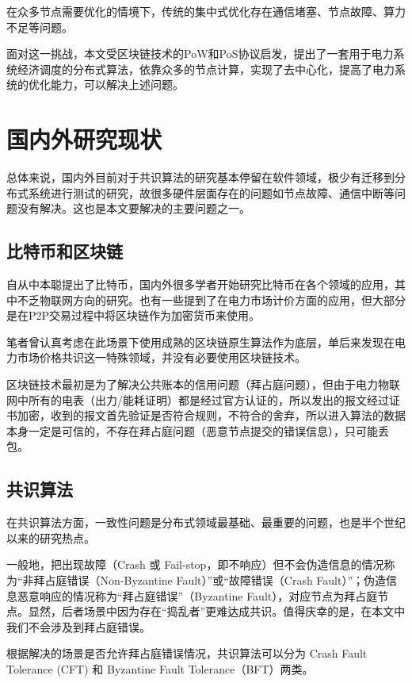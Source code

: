 在众多节点需要优化的情境下，传统的集中式优化存在通信堵塞、节点故障、算力不足等问题。

面对这一挑战，本文受区块链技术的PoW和PoS协议启发，提出了一套用于电力系统经济调度的分布式算法，依靠众多的节点计算，实现了去中心化，提高了电力系统的优化能力，可以解决上述问题。

\section{国内外研究现状}

总体来说，国内外目前对于共识算法的研究基本停留在软件领域，极少有迁移到分布式系统进行测试的研究，故很多硬件层面存在的问题如节点故障、通信中断等问题没有解决。这也是本文要解决的主要问题之一。

\subsection{比特币和区块链}

自从中本聪提出了比特币\cite{nakamoto2008bitcoin}，国内外很多学者开始研究比特币在各个领域的应用，其中不乏物联网方向的研究\cite{zhang2017iot}。也有一些提到了在电力市场计价方面的应用，但大部分是在P2P交易过程中将区块链作为加密货币来使用\cite{tai2016electricity}。

笔者曾认真考虑在此场景下使用成熟的区块链原生算法作为底层，单后来发现在电力市场价格共识这一特殊领域，并没有必要使用区块链技术。

区块链技术最初是为了解决公共账本的信用问题（拜占庭问题），但由于电力物联网中所有的电表（出力/能耗证明）都是经过官方认证的，所以发出的报文经过证书加密，收到的报文首先验证是否符合规则，不符合的舍弃，所以进入算法的数据本身一定是可信的，不存在拜占庭问题（恶意节点提交的错误信息），只可能丢包。

\subsection{共识算法}

在共识算法方面，一致性问题是分布式领域最基础、最重要的问题，也是半个世纪以来的研究热点。

一般地，把出现故障（Crash 或 Fail-stop，即不响应）但不会伪造信息的情况称为“非拜占庭错误（Non-Byzantine Fault）”或“故障错误（Crash Fault）”；伪造信息恶意响应的情况称为“拜占庭错误”（Byzantine Fault），对应节点为拜占庭节点。显然，后者场景中因为存在“捣乱者”更难达成共识。值得庆幸的是，在本文中我们不会涉及到拜占庭错误。

根据解决的场景是否允许拜占庭错误情况，共识算法可以分为 Crash Fault Tolerance (CFT) 和 Byzantine Fault Tolerance（BFT）两类。

